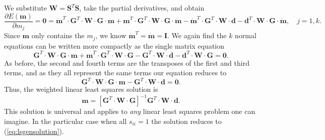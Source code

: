 We substitute $\mathbf{W = S}^T\mathbf{S}$, take the partial derivatives, and obtain
\begin{equation}
\frac{\partial E(\mathbf{m})}{\partial m_j }
= \mathbf{  0 =  \dot{m}}^T \cdot \mathbf{G}^T \cdot \mathbf{W  \cdot G \cdot  m + m}^T \cdot \mathbf{G}^T  \cdot \mathbf{W  \cdot G  \cdot \dot{m} - \dot{m}}^T \cdot \mathbf{G}^T \cdot \mathbf{W  \cdot  d - d}^T \cdot \mathbf{W  \cdot G  \cdot \dot{m}}, \quad j = 1,k.
\end{equation}	 
Since $\mathbf{m}$ only contains the $m_j$, we know $\mathbf{\dot{m}}^T = \mathbf{\dot{m} = I}$. We again find the $k$ normal equations can be written more compactly as the single matrix equation
\begin{equation}
\mathbf{G}^T \cdot \mathbf{W  \cdot G \cdot  m + m}^T \cdot \mathbf{G}^T  \cdot \mathbf{W  \cdot G  -  G}^T \cdot \mathbf{W  \cdot  d - d}^T \cdot \mathbf{W  \cdot G = 0}.
\end{equation}
As before, the second and fourth terms are the transposes of the first and third terms, and as they all represent the same terms our equation reduces to
\begin{equation}
\mathbf{G}^T \cdot \mathbf{W \cdot G \cdot m - G}^T \cdot \mathbf{W \cdot d = 0}.
\end{equation}	 
Thus, the weighted linear least squares solution is
\begin{equation}
\mathbf{m} = \left [ \mathbf{G}^T \cdot \mathbf{W \cdot G} \right ] ^{-1} \mathbf{G}^T \cdot \mathbf{W \cdot d}.
\label{eq:weightedLSgeneral}
\end{equation}
This solution is universal and applies to \emph{any} linear least squares problem one can imagine.
In the particular case when all $s_{ii} = 1$ the solution reduces to (\ref{eq:lsgensolution}).
